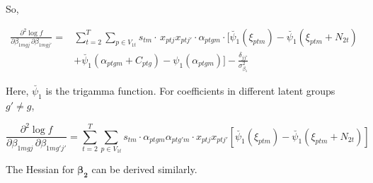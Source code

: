 \documentclass{article}
\begin{document}
So,

\begin{equation*}
\begin{aligned} 
\frac{\partial^2 \log f}{\partial \beta_{1mgj} \, \partial \beta_{1mgj'}} =
& \sum_{t=2}^{T} \sum_{p \in V_{1t}} s_{tm} \cdot  \, x_{ptj} x_{ptj'} \cdot 
 \alpha_{ptgm} \cdot \bigg[ \breve{\psi_{1}}(\xi_{ptm}) - \breve{\psi_{1}}(\xi_{ptm} + N_{2t}) \\
& + \breve{\psi_{1}}(\alpha_{ptgm} + C_{ptg}) - \psi_1(\alpha_{ptgm}) \bigg] - \frac{\delta_{jj'}}{\sigma^2_{\beta_1}}
\end{aligned}
\end{equation*}

Here, $\breve{\psi_{1}}$ is the trigamma function. For coefficients in different latent groups $g\prime \neq g$, 

\begin{equation*}
\frac{\partial^2 \log f}{\partial \beta_{1mgj} \, \partial \beta_{1mg'j'}} =
\sum_{t=2}^{T} \sum_{p \in V_{1t}} s_{tm} \cdot \alpha_{ptgm} \alpha_{ptg'm} \cdot x_{ptj} x_{ptj'}  \left[ \breve{\psi_{1}}(\xi_{ptm}) - \breve{\psi_{1}}(\xi_{ptm} + N_{2t}) \right]
\end{equation*}

The Hessian for $\boldsymbol{\beta_{2}}$ can be derived similarly. 


\end{document}
